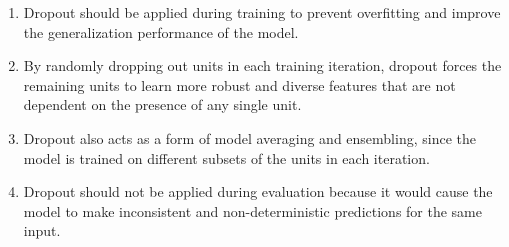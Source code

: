 \begin{parts}
\begin{subparts}
          \begin{enumerate}
            \item Dropout should be applied during training to prevent overfitting and improve the generalization performance of the model.
            \item By randomly dropping out units in each training iteration, dropout forces the remaining units to learn more robust and diverse features that are not dependent on the presence of any single unit.
            \item Dropout also acts as a form of model averaging and ensembling, since the model is trained on different subsets of the units in each iteration.
            \item Dropout should not be applied during evaluation because it would cause the model to make inconsistent and non-deterministic predictions for the same input.
          \end{enumerate}
         
        \end{subparts}


\end{parts}
